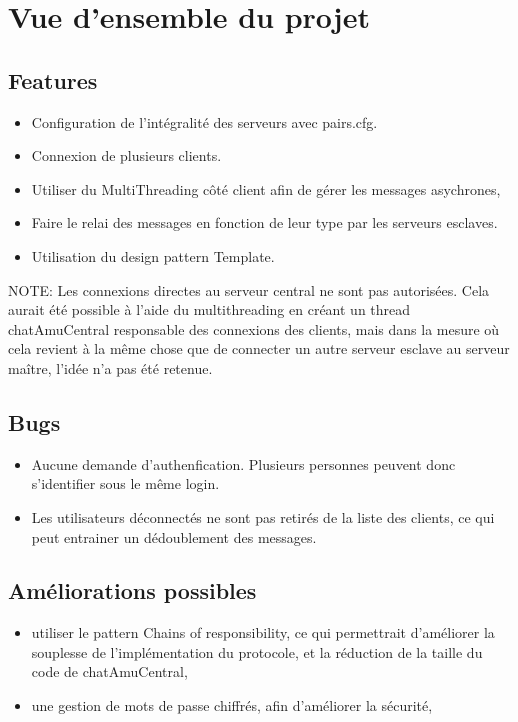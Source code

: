 \section{Vue d'ensemble du projet}

\subsection{Features}

\begin{itemize}
	\item Configuration de l'intégralité des serveurs avec pairs.cfg.
	\item Connexion de plusieurs clients.
	\item Utiliser du MultiThreading côté client afin de gérer les messages asychrones,
	\item Faire le relai des messages en fonction de leur type par les serveurs esclaves.
	\item Utilisation du design pattern Template.
\end{itemize}

NOTE: Les connexions directes au serveur central ne sont pas autorisées. Cela aurait été possible à l'aide du multithreading en créant un thread chatAmuCentral responsable des connexions des clients, mais dans la mesure où cela revient à la même chose que de connecter un autre serveur esclave au serveur maître, l'idée n'a pas été retenue.

\subsection{Bugs}

\begin{itemize}
\item Aucune demande d'authenfication. Plusieurs personnes peuvent donc s'identifier sous le même login.
\item Les utilisateurs déconnectés ne sont pas retirés de la liste des clients, ce qui peut entrainer un dédoublement des messages.
\end{itemize}

\subsection{Améliorations possibles}

\begin{itemize}
	\item utiliser le pattern Chains of responsibility, ce qui permettrait d'améliorer la souplesse de l'implémentation du protocole, et la réduction de la taille du code de chatAmuCentral,
	\item une gestion de mots de passe chiffrés, afin d'améliorer la sécurité,
\end{itemize}
